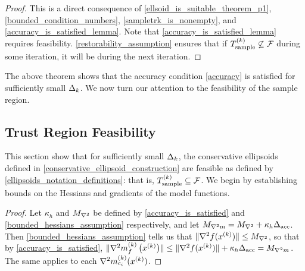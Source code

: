 \begin{proof}
This is a direct consequence of 
\cref{ellsoid_is_suitable_theorem_p1}, 
\cref{bounded_condition_numbers},
\cref{sampletrk_is_nonempty},
and \cref{accuracy_is_satisfied_lemma}.
Note that \cref{accuracy_is_satisfied_lemma} requires feasibility.
\cref{restorability_assumption} ensures that if ${T_{\text{sample}}^{(k)}} \not \subseteq {\mathcal F}$ during some iteration,
it will be during the next iteration.
\end{proof}

The above theorem shows that the accuracy condition \cref{accuracy} is satisfied for sufficiently small $\Delta_k$.   
We now turn our attention to the feasibility of the sample region.

\subsection{Trust Region Feasibility}
\label{ellipsoid_is_feasible_section}

This section show that for sufficiently small $\Delta_k$, the conservative ellipsoids defined in
\cref{conservative_ellipsoid_construction} are feasible as defined by \cref{ellipsoids_notation_definitions}:
that is, ${T_{\text{sample}}^{(k)}} \subseteq {\mathcal F}$.  We begin by establishing bounds on the Hessians and gradients of the model functions.

\begin{proof}
Let $\kappa_h$ and ${M_{\nabla^2}}$ be defined by \cref{accuracy_is_satisfied} and \cref{bounded_hessians_assumption} respectively,
and let ${M_{\nabla^2 m}} = {M_{\nabla^2}} + \kappa_h {\Delta_{\textrm{acc}}}$.
Then \cref{bounded_hessians_assumption} tells us that
$\|\nabla^2 f(x^{(k)})\| \le {M_{\nabla^2}}$, so that by \cref{accuracy_is_satisfied},
$\|{\nabla^2m_f^{(k)}\left(x^{(k)}\right)}\| \le \|\nabla^2 f(x^{(k)})\| + \kappa_h{\Delta_{\textrm{acc}}} = {M_{\nabla^2 m}}$.
The same applies to each $\nabla^2 m_{c_i}^{(k)}(x^{(k)})$.
\end{proof}

